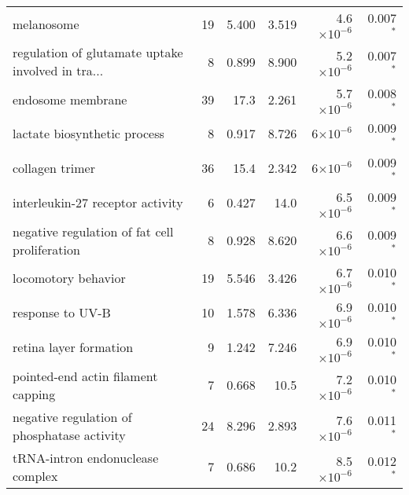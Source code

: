 \begin{longtable}{|l|r|r|r|r|r|}
                                        melanosome &                      19 &                   5.400 &      3.519 &  4.6$\times 10^{-6}$ &                 0.007$\bm{^*}$ \\
 regulation of glutamate uptake involved in tra... &                       8 &                   0.899 &      8.900 &  5.2$\times 10^{-6}$ &                 0.007$\bm{^*}$ \\
                                 endosome membrane &                      39 &                    17.3 &      2.261 &  5.7$\times 10^{-6}$ &                 0.008$\bm{^*}$ \\
                      lactate biosynthetic process &                       8 &                   0.917 &      8.726 &    6$\times 10^{-6}$ &                 0.009$\bm{^*}$ \\
                                   collagen trimer &                      36 &                    15.4 &      2.342 &    6$\times 10^{-6}$ &                 0.009$\bm{^*}$ \\
                  interleukin-27 receptor activity &                       6 &                   0.427 &       14.0 &  6.5$\times 10^{-6}$ &                 0.009$\bm{^*}$ \\
     negative regulation of fat cell proliferation &                       8 &                   0.928 &      8.620 &  6.6$\times 10^{-6}$ &                 0.009$\bm{^*}$ \\
                               locomotory behavior &                      19 &                   5.546 &      3.426 &  6.7$\times 10^{-6}$ &                 0.010$\bm{^*}$ \\
                                  response to UV-B &                      10 &                   1.578 &      6.336 &  6.9$\times 10^{-6}$ &                 0.010$\bm{^*}$ \\
                            retina layer formation &                       9 &                   1.242 &      7.246 &  6.9$\times 10^{-6}$ &                 0.010$\bm{^*}$ \\
                pointed-end actin filament capping &                       7 &                   0.668 &       10.5 &  7.2$\times 10^{-6}$ &                 0.010$\bm{^*}$ \\
       negative regulation of phosphatase activity &                      24 &                   8.296 &      2.893 &  7.6$\times 10^{-6}$ &                 0.011$\bm{^*}$ \\
                  tRNA-intron endonuclease complex &                       7 &                   0.686 &       10.2 &  8.5$\times 10^{-6}$ &                 0.012$\bm{^*}$ \\

\end{longtable}
